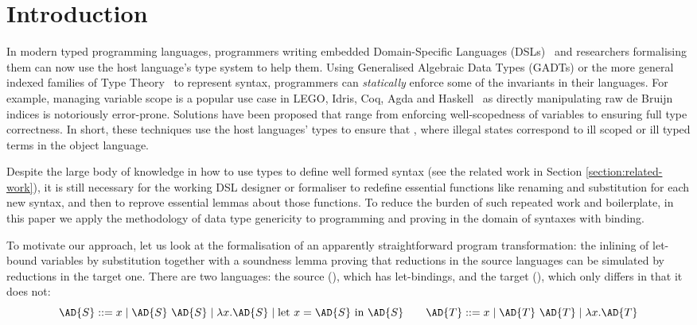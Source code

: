 
\newcommand{\semrec}{\AR{Semantics}}
\newcommand{\semfun}{\AF{semantics}}

\section{Introduction}

In modern typed programming languages, programmers writing embedded
Domain-Specific Languages (DSLs)~\cite{hudak1996building} and researchers formalising them can now
use the host language's type system to help them. Using Generalised
Algebraic Data Types (GADTs) or the more general indexed families of
Type Theory~\cite{dybjer1994inductive} to represent syntax,
programmers can \emph{statically} enforce some of the invariants in
their languages. For example, managing variable scope is a popular use
case in LEGO, Idris, Coq, Agda and
Haskell~\cite{altenkirch1999monadic,DBLP:conf/gpce/BradyH06,DBLP:journals/jar/HirschowitzM12,DBLP:conf/icfp/KeuchelJ12,BachPoulsen,plfa2018,Eisenberg20}
as directly manipulating raw de Bruijn indices is notoriously
error-prone. Solutions have been proposed that range from enforcing
well-scopedness of variables to ensuring full type correctness. In
short, these techniques use the host languages' types to ensure that
, where illegal states
correspond to ill scoped or ill typed terms in the object language.

Despite the large body of knowledge in how to use types to define well
formed syntax (see the related work in Section
\ref{section:related-work}), it is still necessary for the working DSL
designer or formaliser to redefine essential functions like renaming
and substitution for each new syntax, and then to reprove essential
lemmas about those functions. To reduce the burden of such repeated
work and boilerplate, in this paper we apply the methodology of
data type genericity to programming and proving
  in the domain of 
syntaxes with binding.

To motivate our approach, let us look at the formalisation of an
apparently straightforward program transformation: the inlining of
let-bound variables by substitution together with a soundness lemma
proving that reductions in the source languages can be simulated by
reductions in the target one. There are two languages: the source
(), which has let-bindings, and the target (), which only
differs in that it does not:
\begin{displaymath}
  \AD{S} ::= x \mid \AD{S}~\AD{S} \mid \lambda x. \AD{S} \mid \textrm{let }x=\AD{S}\textrm{ in }\AD{S}
  \qquad
  \AD{T} ::= x \mid \AD{T}~\AD{T} \mid \lambda x. \AD{T}
\end{displaymath}

